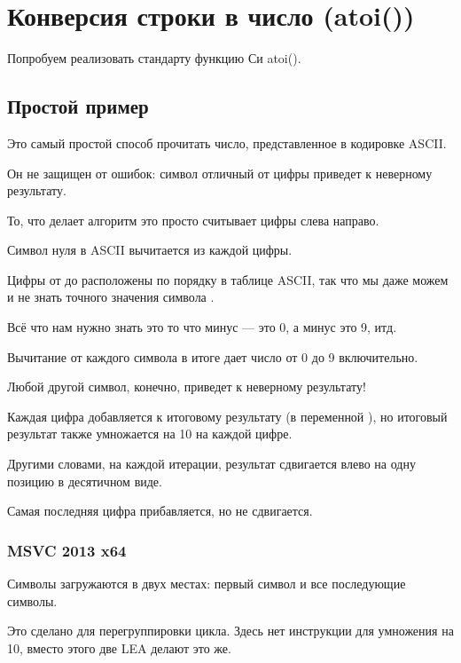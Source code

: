 \section{Конверсия строки в число (atoi())}

Попробуем реализовать стандарту функцию Си atoi().

\subsection{Простой пример}

Это самый простой способ прочитать число, представленное в кодировке \ac{ASCII}.

Он не защищен от ошибок: символ отличный от цифры приведет к неверному результату.



То, что делает алгоритм это просто считывает цифры слева направо.

Символ нуля в \ac{ASCII} вычитается из каждой цифры.

Цифры от  до  расположены по порядку в таблице \ac{ASCII}, так что мы даже можем
и не знать точного значения символа .

Всё что нам нужно знать это то что  минус  --- это 0, а  минус  это 9, итд.

Вычитание  от каждого символа в итоге дает число от 0 до 9 включительно.

Любой другой символ, конечно, приведет к неверному результату!

Каждая цифра добавляется к итоговому результату (в переменной ), но итоговый результат
также умножается на 10 на каждой цифре.

Другими словами, на каждой итерации, результат сдвигается влево на одну позицию в десятичном виде.

Самая последняя цифра прибавляется, но не сдвигается.

\subsubsection{\Optimizing MSVC 2013 x64}



Символы загружаются в двух местах: первый символ и все последующие символы.

Это сделано для перегруппировки цикла.
Здесь нет инструкции для умножения на 10, вместо этого две LEA делают это же.

